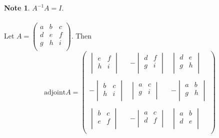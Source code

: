 \documentclass[11pt,a4paper]{article}
\theoremstyle{definition}
\newtheorem{note}[thm]{Note}
\begin{document}
\begin{note}
 $A^{-1}A=I.$\\\\
Let $A=
\begin{pmatrix}
a & b & c\\
d & e & f\\
g & h & i\\
\end{pmatrix}
$. Then \\

$$
\text{adjoint}A=
\begin{pmatrix}
\begin{vmatrix}
e & f\\
h & i\\
\end{vmatrix}
& -
\begin{vmatrix}
d & f\\
g & i\\
\end{vmatrix}
& 
\begin{vmatrix}
d & e\\
g & h\\
\end{vmatrix}\\\\
-
\begin{vmatrix}
b & c\\
h & i\\
\end{vmatrix}
&
\begin{vmatrix}
a & c\\
g & i\\
\end{vmatrix}
& -
\begin{vmatrix}
a & b\\
g & h\\
\end{vmatrix}\\\\
\begin{vmatrix}
b & c\\
e & f\\
\end{vmatrix}
& -
\begin{vmatrix}
a & c\\
d & f\\
\end{vmatrix}
&
\begin{vmatrix}
a & b\\
d & e\\
\end{vmatrix}\\
\end{pmatrix}
$$\\\\


\end{note}
\end{document}
